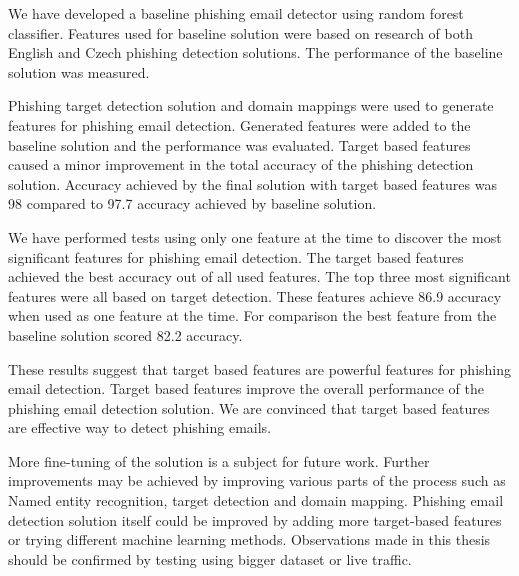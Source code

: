 \documentclass[thesis=B,english]{FITthesis}[2012/10/20]
\begin{document}
We have developed a baseline phishing email detector using random forest classifier.
Features used for baseline solution were based on research of both English and Czech phishing detection solutions.
The performance of the baseline solution was measured.

Phishing target detection solution and domain mappings were used to generate features for phishing email detection.
Generated features were added to the baseline solution and the performance was evaluated.
Target based features caused a minor improvement in the total accuracy of the phishing detection solution. Accuracy achieved by the final solution with target based features was 98 compared to 97.7 accuracy achieved by baseline solution.

We have performed tests using only one feature at the time to discover the most significant features for phishing email detection.
The target based features achieved the best accuracy out of all used features. 
The top three most significant features were all based on target detection. These features achieve 86.9 accuracy when used as one feature at the time. For comparison the best feature from the baseline solution scored 82.2 accuracy.

These results suggest that target based features are powerful features for phishing email detection. 
Target based features improve the overall performance of the phishing email detection solution.
We are convinced that target based features are effective way to detect phishing emails.

More fine-tuning of the solution is a subject for future work. 
Further improvements may be achieved by improving various parts of the process such as Named entity recognition, target detection and domain mapping.
Phishing email detection solution itself could be improved by adding more target-based features or trying different machine learning methods.
Observations made in this thesis should be confirmed by testing using bigger dataset or live traffic.





\appendix
\end{document}
